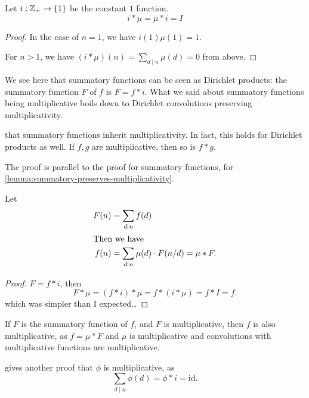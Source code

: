 \begin{lemma}
    Let $i: \mathbb Z_+\to \{1\}$ be the constant $1$ function.
    \[i * \mu = \mu * i = I\]
\end{lemma}
\begin{proof} In the case of $n=1$, we have $i(1)\mu(1) = 1$.

    For $n > 1$, we have $(i * \mu)(n) = \displaystyle \sum_{d\mid n}\mu(d) = 0$ from above.
\end{proof}

We see here that summatory functions can be seen as Dirichlet products: the summatory function $F$ of $f$ is $F = f * i$. What we said about summatory functions being multiplicative boils down to Dirichlet convolutions preserving multiplicativity.

\recall that summatory functions inherit multiplicativity. In fact, this holds for Dirichlet products as well. If $f, g$ are multiplicative, then so is $f * g$.

The proof is parallel to the proof for summatory functions, for \cref{lemma:summatory-preserves-multiplicativity}.

\begin{theorem}
    Let
    \begin{align*}
        F(n) & = \sum_{d\mid n} f(d)                         \\
        \intertext{Then we have }
        f(n) & = \sum_{d\mid n}\mu(d)\cdot F(n/d) = \mu * F.
    \end{align*}
\end{theorem}
\begin{proof}
    $F = f * i$, then \[F * \mu = (f * i) * \mu = f * (i * \mu) = f * I = f.\]
    which was simpler than I expected\dots
\end{proof}

\begin{corollary}\label{cor:summatory-multiplicativity-original-multiplicative}
    If $F$ is the summatory function of $f$, and $F$ is multiplicative, then $f$ is also multiplicative, as $f = \mu * F$ and $\mu$ is multiplicative and convolutions with multiplicative functions are multiplicative.
\end{corollary}
\begin{corollary}
     gives another proof that $\phi$ is multiplicative, as \[\sum_{d\mid n}\phi(d) = \phi * i = \mathrm{id}.\]
\end{corollary}

